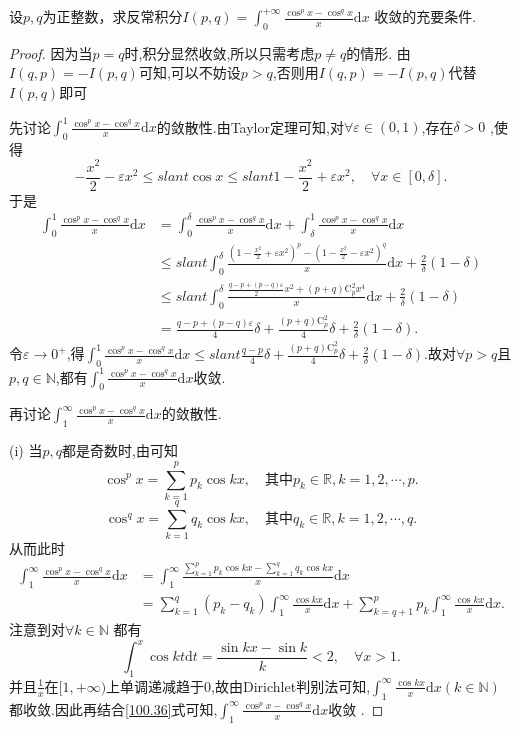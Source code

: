 \documentclass[../../main.tex]{subfiles}
\begin{document}
\begin{example}
设\(p,q\)为正整数，求反常积分$I(p,q)=\int_{0}^{+\infty}\frac{\cos^{p}x - \cos^{q}x}{x}\mathrm{d}x$
收敛的充要条件.
\end{example}
\begin{proof}
因为当$p=q$时,积分显然收敛,所以只需考虑$p\ne q$的情形. 由$I(q,p) =-I(p,q)$可知,可以不妨设$p>q$,否则用$I(q,p) =-I(p,q)$代替$I(p,q)$即可

先讨论$\int_0^1{\frac{\cos ^px-\cos ^qx}{x}\mathrm{d}x}$的敛散性.由Taylor定理可知,对$\forall \varepsilon \in (0,1)$,存在$\delta >0$ ,使得  
\[
-\frac{x^2}{2}-\varepsilon x^2\leqslant slant \cos x\leqslant slant 1-\frac{x^2}{2}+\varepsilon x^2 ,\quad \forall x\in [0,\delta].
\]  
于是  
\begin{align*}
\int_0^1{\frac{\cos ^px-\cos ^qx}{x}\mathrm{d}x}&=\int_0^{\delta}{\frac{\cos ^px-\cos ^qx}{x}\mathrm{d}x}+\int_{\delta}^1{\frac{\cos ^px-\cos ^qx}{x}\mathrm{d}x}\\
&\leqslant slant \int_0^{\delta}{\frac{(1-\frac{x^2}{2}+\varepsilon x^2)^p-(1-\frac{x^2}{2}-\varepsilon x^2)^q}{x}\mathrm{d}x}+\frac{2}{\delta}(1-\delta)\\
&\leqslant slant \int_0^{\delta}{\frac{\frac{q-p+(p-q)\varepsilon}{2}x^2+(p+q)\mathrm{C}_{p}^{2}x^4}{x}\mathrm{d}x}+\frac{2}{\delta}(1-\delta)\\
&=\frac{q-p+(p-q)\varepsilon}{4}\delta +\frac{(p+q)\mathrm{C}_{p}^{2}}{4}\delta +\frac{2}{\delta}(1-\delta).
\end{align*}  
令$\varepsilon \rightarrow 0^+$,得$\int_0^1{\frac{\cos ^px-\cos ^qx}{x}\mathrm{d}x}\leqslant slant \frac{q-p}{4}\delta +\frac{(p+q)\mathrm{C}_{p}^{2}}{4}\delta +\frac{2}{\delta}(1-\delta)$.故对$\forall p>q$且$p,q\in \mathbb{N}$,都有$\int_0^1{\frac{\cos ^px-\cos ^qx}{x}\mathrm{d}x}$收敛.

再讨论$\int_1^{\infty}{\frac{\cos ^px-\cos ^qx}{x}\mathrm{d}x}$的敛散性.

(i) 当$p,q$都是奇数时,由可知  
$$
\cos ^px=\sum_{k=1}^p{p_k\cos kx} ,\quad \text{其中}p_k\in \mathbb{R} , k=1,2,\cdots,p.
$$  
$$
\cos ^qx=\sum_{k=1}^q{q_k\cos kx} ,\quad \text{其中}q_k\in \mathbb{R} , k=1,2,\cdots,q.
$$  
从而此时  
\begin{align*}
\int_1^{\infty}{\frac{\cos ^px-\cos ^qx}{x}\mathrm{d}x}&=\int_1^{\infty}{\frac{\sum\limits_{k=1}^p{p_k\cos kx}-\sum\limits_{k=1}^q{q_k\cos kx}}{x}\mathrm{d}x}\\
&=\sum\limits_{k=1}^q{(p_k-q_k)\int_1^{\infty}{\frac{\cos kx}{x}\mathrm{d}x}}+\sum\limits_{k=q+1}^p{p_k\int_1^{\infty}{\frac{\cos kx}{x}\mathrm{d}x}} .\label{100.36}
\end{align*}  
注意到对$\forall k\in \mathbb{N}$ 都有  
$$
\int_1^x{\cos kt\mathrm{d}t}=\frac{\sin kx-\sin k}{k}<2 ,\quad \forall x>1.
$$  
并且$\frac{1}{x}$在$[1,+\infty)$上单调递减趋于0,故由Dirichlet判别法可知,$\int_1^{\infty}{\frac{\cos kx}{x}\mathrm{d}x}(k\in \mathbb{N})$都收敛.因此再结合\eqref{100.36}式可知,$\int_1^{\infty}{\frac{\cos ^px-\cos ^qx}{x}\mathrm{d}x}$收敛 . 


\end{proof}
\end{document}

